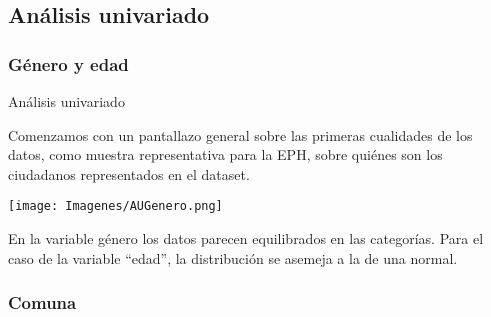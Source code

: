 \documentclass[pdf]{beamer}
\begin{document}

\subsection{Análisis univariado}

    \subsubsection{Género y edad}

\begin{frame}{Análisis univariado}

    Comenzamos con un pantallazo general sobre las primeras cualidades de los datos, como muestra representativa para la EPH, sobre quiénes son los ciudadanos representados en el dataset.

    \begin{center}
        \texttt{[image: Imagenes/AUGenero.png]}
    \end{center}

    En la variable género los datos parecen equilibrados en las categorías. Para el caso de la variable ``edad'', la distribución se asemeja a la de una normal.

\end{frame}
              
    \subsubsection{Comuna}
           
           
           
\end{document}
